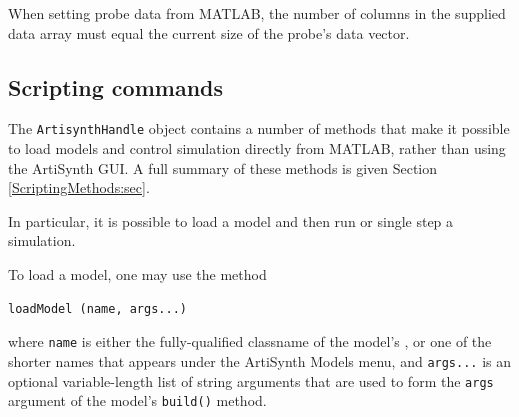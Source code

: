 \documentclass{article}
\begin{document}
\begin{sideblock}
When setting probe data from MATLAB, the number of columns in the
supplied data array must equal the current size of the probe's data
vector.
\end{sideblock}

\subsection{Scripting commands}
\label{MatlabScripting:sec}

The {\tt ArtisynthHandle} object contains a number of methods that
make it possible to load models and control simulation directly from
MATLAB, rather than using the ArtiSynth GUI. A full summary of these
methods is given Section \ref{ScriptingMethods:sec}.

In particular, it is possible to load a model and then run or single
step a simulation.

To load a model, one may use the method
%
\begin{lstlisting}[]
  loadModel (name, args...)
\end{lstlisting}
%
where {\tt name} is either the fully-qualified classname of the
model's 
,
or one of the shorter names that appears
under the ArtiSynth {\sf Models} menu, and {\tt args...} is an
optional variable-length list of string arguments that are used to
form the {\tt args} argument of the model's {\tt build()} method.
\end{document}
